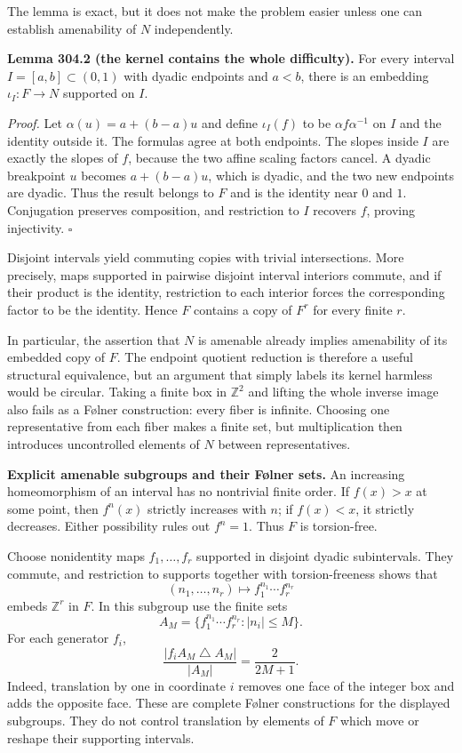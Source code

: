 \documentclass[11pt]{article}
\begin{document}
The lemma is exact, but it does not make the problem easier unless one can establish amenability of $N$ independently.

\textbf{Lemma 304.2 (the kernel contains the whole difficulty).} For every interval $I=[a,b]\subset(0,1)$ with dyadic endpoints and $a<b$, there is an embedding $\iota_I:F\to N$ supported on $I$.

\emph{Proof.} Let $\alpha(u)=a+(b-a)u$ and define $\iota_I(f)$ to be $\alpha f\alpha^{-1}$ on $I$ and the identity outside it. The formulas agree at both endpoints. The slopes inside $I$ are exactly the slopes of $f$, because the two affine scaling factors cancel. A dyadic breakpoint $u$ becomes $a+(b-a)u$, which is dyadic, and the two new endpoints are dyadic. Thus the result belongs to $F$ and is the identity near $0$ and $1$. Conjugation preserves composition, and restriction to $I$ recovers $f$, proving injectivity. $\square$

Disjoint intervals yield commuting copies with trivial intersections. More precisely, maps supported in pairwise disjoint interval interiors commute, and if their product is the identity, restriction to each interior forces the corresponding factor to be the identity. Hence $F$ contains a copy of $F^r$ for every finite $r$.

In particular, the assertion that $N$ is amenable already implies amenability of its embedded copy of $F$. The endpoint quotient reduction is therefore a useful structural equivalence, but an argument that simply labels its kernel harmless would be circular. Taking a finite box in $\mathbb Z^2$ and lifting the whole inverse image also fails as a F\o lner construction: every fiber is infinite. Choosing one representative from each fiber makes a finite set, but multiplication then introduces uncontrolled elements of $N$ between representatives.

\textbf{Explicit amenable subgroups and their F\o lner sets.} An increasing homeomorphism of an interval has no nontrivial finite order. If $f(x)>x$ at some point, then $f^n(x)$ strictly increases with $n$; if $f(x)<x$, it strictly decreases. Either possibility rules out $f^n=1$. Thus $F$ is torsion-free.

Choose nonidentity maps $f_1,\ldots,f_r$ supported in disjoint dyadic subintervals. They commute, and restriction to supports together with torsion-freeness shows that
\[
 (n_1,\ldots,n_r)\longmapsto f_1^{n_1}\cdots f_r^{n_r}
\]
embeds $\mathbb Z^r$ in $F$. In this subgroup use the finite sets
\[
 A_M=\{f_1^{n_1}\cdots f_r^{n_r}:|n_i|\leq M\}.
\]
For each generator $f_i$,
\[
 \frac{|f_iA_M\mathbin{\triangle}A_M|}{|A_M|}
   =\frac{2}{2M+1}.
 \tag{304.2}
\]
Indeed, translation by one in coordinate $i$ removes one face of the integer box and adds the opposite face. These are complete F\o lner constructions for the displayed subgroups. They do not control translation by elements of $F$ which move or reshape their supporting intervals.
\end{document}
